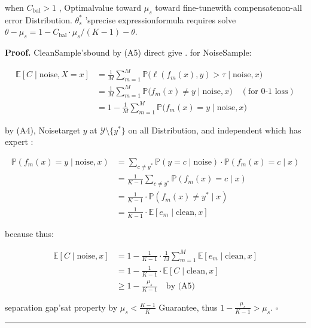 \documentclass[
  12pt,
]{article}
\begin{document}
when  \(C_{\text{bal}} > 1\) , Optimalvalue toward  \(\mu_s\)
toward fine-tunewith compensatenon-all error Distribution. \(\theta_s^*\) 'sprecise expressionformula requires solve
\(\theta - \mu_s = 1 - C_{\text{bal}} \cdot \mu_s/(K-1) - \theta\). 

\textbf{Proof.} CleanSample'sbound by  (A5) direct give . for NoiseSample: 

\[\begin{aligned}
\mathbb{E}[C \mid \text{noise}, X = x] 
&= \frac{1}{M} \sum_{m=1}^M \mathbb{P}\bigl(\ell(f_m(x), y) > \tau \;\big|\; \text{noise}, x\bigr) \\
&= \frac{1}{M} \sum_{m=1}^M \mathbb{P}\bigl(f_m(x) \neq y \;\big|\; \text{noise}, x\bigr) \quad (\text{for  } 0\text{-}1 \text{ loss}) \\
&= 1 - \frac{1}{M} \sum_{m=1}^M \mathbb{P}\bigl(f_m(x) = y \;\big|\; \text{noise}, x\bigr)
\end{aligned}\]

by  (A4), Noisetarget  \(y\) at  \(\mathcal{Y} \setminus \{y^*\}\)
on all Distribution, and independent which has expert : 

\[\begin{aligned}
\mathbb{P}(f_m(x) = y \mid \text{noise}, x) 
&= \sum_{c \neq y^*} \mathbb{P}(y = c \mid \text{noise}) \cdot \mathbb{P}(f_m(x) = c \mid x) \\
&= \frac{1}{K-1} \sum_{c \neq y^*} \mathbb{P}(f_m(x) = c \mid x) \\
&= \frac{1}{K-1} \cdot \mathbb{P}(f_m(x) \neq y^* \mid x) \\
&= \frac{1}{K-1} \cdot \mathbb{E}[e_m \mid \text{clean}, x]
\end{aligned}\]

because thus: 

\[\begin{aligned}
\mathbb{E}[C \mid \text{noise}, x] 
&= 1 - \frac{1}{K-1} \cdot \frac{1}{M} \sum_{m=1}^M \mathbb{E}[e_m \mid \text{clean}, x] \\
&= 1 - \frac{1}{K-1} \cdot \mathbb{E}[C \mid \text{clean}, x] \\
&\geq 1 - \frac{\mu_s}{K-1} \quad \text{by  (A5)}
\end{aligned}\]

separation gap'sat property by  \(\mu_s < \frac{K-1}{K}\) Guarantee, thus
\(1 - \frac{\mu_s}{K-1} > \mu_s\). \(\square\)

\begin{center}\rule{0.5\linewidth}{0.5pt}\end{center}
\end{document}

